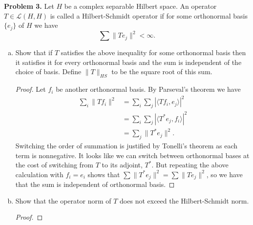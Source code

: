 \documentclass[11pt,letterpaper]{report}
\newcommand{\mcal}[1]{\mathcal{#1}}
\begin{document}
\noindent\textbf{Problem 3. }Let $H$ be a complex separable Hilbert space. An operator $T\in \mcal{L}(H, H)$ is called a Hilbert-Schmidt operator if for some orthonormal basis $\{e_j\}$ of $H$ we have
\[
\sum \|Te_j\|^2<\infty.
\]
\begin{enumerate}[(a)]
	\item Show that if $T$ satisfies the above inequality for some orthonormal basis then it satisfies it for every orthonormal basis and the sum is independent of the choice of basis. Define $\|T\|_{HS}$ to be the square root of this sum.
	\begin{proof}
		Let $f_i$ be another orthonormal basis. By Parseval's theorem we have
		\begin{align*}
			\sum_i \|Tf_i\|^2 &= \sum_i\sum_j|\langle Tf_i, e_j\rangle|^2\\
			&= \sum_i\sum_j|\langle T^*e_j, f_i\rangle|^2\\
			&= \sum_j\|T^*e_j\|^2.
		\end{align*}
		Switching the order of summation is justified by Tonelli's theorem as each term is nonnegative. It looks like we can switch between orthonormal bases at the cost of switching from $T$ to its adjoint, $T^*$. But repeating the above calculation with $f_i = e_i$ shows that $\sum \|T^*e_j\|^2 = \sum \|Te_j\|^2$, so we have that the sum is independent of orthonormal basis.
	\end{proof}

	\item Show that the operator norm of $T$ does not exceed the Hilbert-Schmidt norm.
	\begin{proof}
		
	\end{proof}
\end{enumerate}
\end{document}
